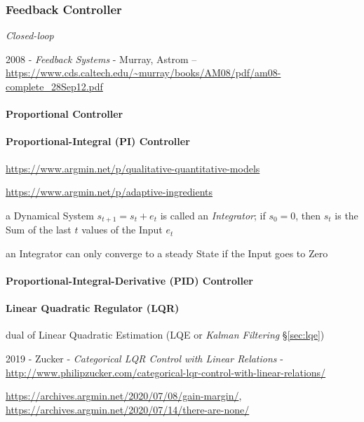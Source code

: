 \subsubsection{Feedback Controller}\label{sec:feedback_controller}

\emph{Closed-loop}

2008 - \emph{Feedback Systems} - Murray, Astrom --
\url{https://www.cds.caltech.edu/~murray/books/AM08/pdf/am08-complete_28Sep12.pdf}



\paragraph{Proportional Controller}\label{sec:proportional_controller}\hfill

\paragraph{Proportional-Integral (PI) Controller}\label{sec:pi_controller}\hfill

\url{https://www.argmin.net/p/qualitative-quantitative-models}

\url{https://www.argmin.net/p/adaptive-ingredients}

a Dynamical System $s_{t+1} = s_t + e_t$ is called an \emph{Integrator}; if
$s_0 = 0$, then $s_t$ is the Sum of the last $t$ values of the Input $e_t$

an Integrator can only converge to a steady State if the Input goes to Zero



\paragraph{Proportional-Integral-Derivative (PID) Controller}
\label{sec:pid_controller}\hfill

\paragraph{Linear Quadratic Regulator (LQR)}\label{sec:lqr}\hfill

dual of Linear Quadratic Estimation (LQE or \emph{Kalman Filtering}
\S\ref{sec:lqe})

2019 - Zucker - \emph{Categorical LQR Control with Linear Relations} -
  \url{http://www.philipzucker.com/categorical-lqr-control-with-linear-relations/}

\url{https://archives.argmin.net/2020/07/08/gain-margin/},
\url{https://archives.argmin.net/2020/07/14/there-are-none/}



